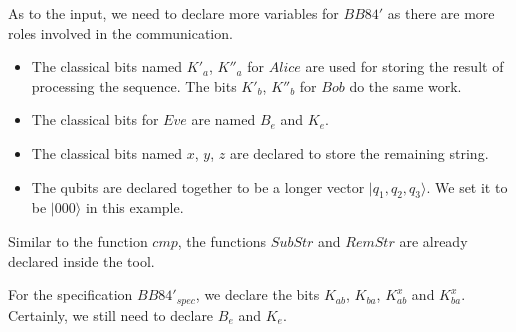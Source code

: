 \documentclass[a4paper,runningheads]{llncs}
\begin{document}
\smallskip
As to the input, we need to declare more variables for $BB84'$ as there are more roles involved in the communication.
\begin{itemize}
    \item The classical bits named $K'_a$, $K''_a$ for $Alice$ are used for storing the result of processing the sequence. The bits $K'_b$, $K''_b$ for $Bob$ do the same work.
    \item The classical bits for $Eve$ are named $B_e$ and $K_e$.
    \item The classical bits named $x$, $y$, $z$ are declared to store the remaining string.
    \item The qubits are declared together to be a longer vector $|q_1,q_2,q_3\rangle$. We set it to be $|000\rangle$ in this example.
\end{itemize}
Similar to the function $cmp$, the functions $SubStr$ and $RemStr$ are already declared inside the tool. 

For the specification $BB84'_{spec}$, we declare the bits $K_{ab}$, $K_{ba}$, $K^x_{ab}$ and $K^x_{ba}$. Certainly, we still need to declare $B_e$ and $K_e$.


\end{document}
